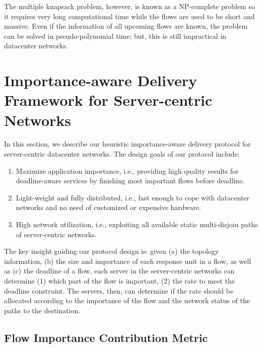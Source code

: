 \documentclass[conference]{IEEEtran}
\begin{document}
The multiple knapsack problem, however, is known as a NP-complete problem\cite{reducibility} so it requires very long computational time while the flows are used to be short and massive. Even if the information of all upcoming flows are known, the problem can be solved in pseudo-polynomial time; but, this is still impractical in datacenter networks.

\section{Importance-aware Delivery Framework for
Server-centric Networks}

In this section, we describe our heuristic importance-aware delivery protocol for server-centric datacenter networks. The design goals of our protocol include:
\begin{enumerate}
\item Maximize application importance, i.e., providing high quality results for deadline-aware services by finishing most important flows before deadline.
\item Light-weight and fully distributed, i.e., fast enough to cope with datacenter networks and no need of customized or expensive hardware.
\item High network utilization, i.e., exploiting all available static multi-disjoin paths of server-centric networks.
\end{enumerate}
The key insight guiding our protocol design is: given (a) the topology information, (b) the size and importance of each response unit in a flow, as well as (c) the deadline of a flow, each server in the server-centric networks can determine (1) which part of the flow is important, (2) the rate to meet the deadline constraint. The servers, then, can determine if the rate should be allocated according to the importance of the flow and the network status of the paths to the destination.

\subsection{Flow Importance Contribution Metric}
\end{document}
